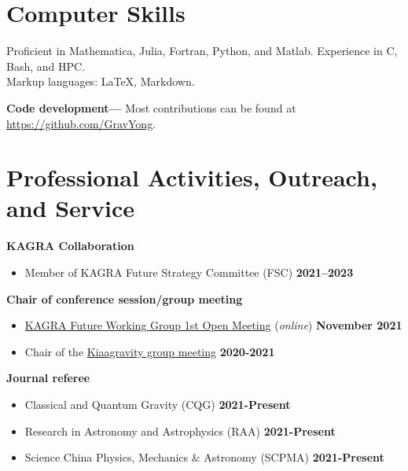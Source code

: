 \documentclass[margin,line]{res}
\begin{document}
\begin{resume}
\section{\sc Computer Skills}
Proficient in {\sc Mathematica}, Julia, Fortran, Python, and Matlab. Experience in C, Bash, and HPC.\\
Markup languages: \LaTeX, Markdown.


{\bf Code development---} Most contributions can be found at \url{https://github.com/GravYong}.

\section{\sc Professional Activities, Outreach, and Service}
{\bf KAGRA Collaboration}
\vspace*{.05in}
\begin{itemize}
\item[] Member of KAGRA Future Strategy Committee (FSC) \hfill{\bf 2021--2023}
\end{itemize}


{\bf Chair of conference session/group meeting}
\vspace*{.05in}
\begin{itemize}
\item[]
\href{https://gwwiki.icrr.u-tokyo.ac.jp/JGWwiki/KAGRA/KSC/FSC/FWG/1stMeeting}{KAGRA Future Working Group 1st Open Meeting} ({\it online}) \hfill {\bf November 2021}
\end{itemize}
\begin{itemize}
  \item[]
  {Chair of the }\href{https://kiaagravity.github.io}{\sc Kiaagravity group meeting}   \hfill {\bf 2020-2021}
  \end{itemize}

{\bf Journal referee}
\vspace*{.05in}
\begin{itemize}
  \item[]
  Classical and Quantum Gravity (CQG)
  \hfill {\bf 2021-Present}
  \item[]
  Research in Astronomy and Astrophysics (RAA)
  \hfill {\bf 2021-Present}
  \item[]
  Science China Physics, Mechanics $\&$ Astronomy (SCPMA)
  \hfill {\bf 2021-Present}
\end{itemize}


\end{resume}
\end{document}
